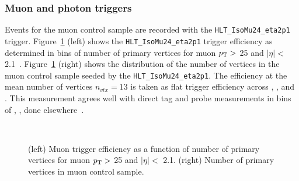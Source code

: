 \subsubsection{Muon and photon triggers\label{sec:muon_triggers}}

Events for the muon control sample are recorded with the \verb!HLT_IsoMu24_eta2p1! 
trigger. Figure~\ref{fig:eff-muon} (left) shows the \verb!HLT_IsoMu24_eta2p1! 
trigger efficiency as determined in bins of number of primary vertices 
for muon $p_{\mathrm{T}} >$ 25 \gev and $|\eta| <$ 2.1~\cite{ref:muon-eff}.
Figure~\ref{fig:eff-muon} (right) shows the distribution of the number 
of vertices in the muon control sample seeded by the \verb!HLT_IsoMu24_eta2p1!. 
The efficiency at the mean number of vertices $n_{vtx}=13$ is taken as flat
trigger efficiency across \njet, \nb, and \scalht. This measurement 
agrees well with direct tag and probe measurements in bins of 
\njet, \nb, \scalht done elsewhere~\cite{RA1Paper2012}.

\begin{figure}[!h]
  \begin{center}
  \\     
    \caption{\label{fig:eff-muon}
    (left) Muon trigger efficiency as a function of
    number of primary vertices for muon $p_{\mathrm{T}}>$ 25 \gev and
    $|\eta| <$ 2.1. (right) Number of primary vertices
    in muon control sample.} 
 
  \end{center}
\end{figure}

